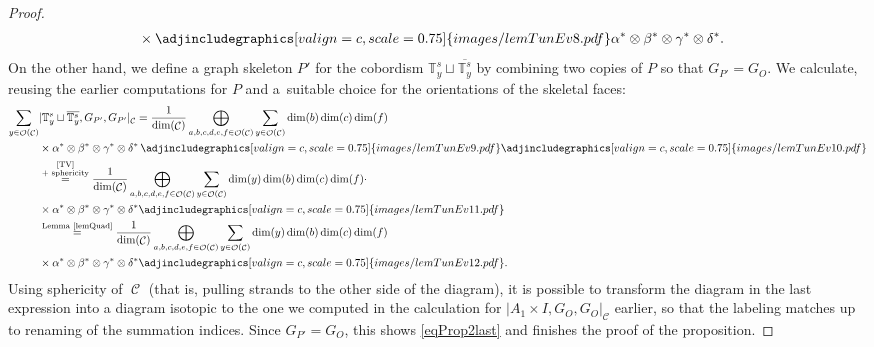 \documentclass[pdftex]{sigma}
\DeclareMathOperator{\calc}{\mathcal{C}}
\DeclareMathOperator{\calo}{\mathcal{O}}
\numberwithin{equation}{section}
\theoremstyle{definition}
\begin{document}
\begin{proof}
\begin{align*}
 & \times \adjincludegraphics[valign=c, scale = 0.75]{images/lemTunEv8.pdf} \alpha^* \otimes \beta^* \otimes \gamma^* \otimes \delta^*.
 \end{align*}
On the other hand, we define a graph skeleton $P'$ for the cobordism $\mathbb{T}_y^s \sqcup \overline{\mathbb{T}_y^s}$ by combining two copies of $P$ so that $G_{P'} = G_O$. We calculate, reusing the earlier computations for $P$ and a~suitable choice for the orientations of the skeletal faces:
 \begin{align*}
 \sum_{y \in \calo(\calc)} &|\mathbb{T}_y^s \sqcup \overline{\mathbb{T}_y^s}, G_{P'}, G_{P'}|_{\calc} = \frac{1}{\dim(\calc)} \bigoplus_{a, b, c, d, e, f \in \calo(\calc)} \sum_{y \in \calo(\calc)} \dim(b) \dim(c) \dim(f) \\
 &\times \alpha^* \otimes \beta^* \otimes \gamma^* \otimes \delta^* \,\adjincludegraphics[valign=c, scale = 0.75]{images/lemTunEv9.pdf} \adjincludegraphics[valign=c, scale = 0.75]{images/lemTunEv10.pdf}\\
 &\overset{\substack{\text{\cite[Lemma 12.3]{TV}} \\ \text{+ sphericity}}}{=} \frac{1}{\dim(\calc)} \bigoplus_{a, b, c, d, e, f \in \calo(\calc)} \sum_{y \in \calo(\calc)} \dim(y)\dim(b) \dim(c) \dim(f) \cdot \\
 &\times \alpha^* \otimes \beta^* \otimes \gamma^* \otimes \delta^* \adjincludegraphics[valign=c, scale = 0.75]{images/lemTunEv11.pdf} \\
 &\overset{\text{Lemma~\ref{lemQuad}}}{=} \frac{1}{\dim(\calc)} \bigoplus_{a, b, c, d, e, f \in \calo(\calc)} \sum_{y \in \calo(\calc)} \dim(y)\dim(b) \dim(c) \dim(f) \\
 &\times \alpha^* \otimes \beta^* \otimes \gamma^* \otimes \delta^* \adjincludegraphics[valign=c, scale = 0.75]{images/lemTunEv12.pdf}.
 \end{align*}
Using sphericity of $\calc$ (that is, pulling strands to the other side of the diagram), it is possible to transform the diagram in the last expression into a diagram isotopic to the one we computed in the calculation for $|A_1 \times I, G_O, G_O|_{\calc}$ earlier, so that the labeling matches up to renaming of the summation indices. Since $G_{P'} = G_O$, this shows \eqref{eqProp2last} and finishes the proof of the proposition.
\end{proof}
\end{document}
